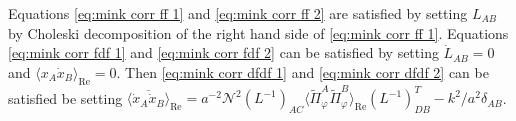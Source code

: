 Equations \eqref{eq:mink corr ff 1} and \eqref{eq:mink corr ff 2} are satisfied by setting $L_{AB}$ by Choleski decomposition of the right hand side of \eqref{eq:mink corr ff 1}. Equations \eqref{eq:mink corr fdf 1} and \eqref{eq:mink corr fdf 2} can be satisfied by setting $\dot{L}_{AB} = 0$ and $\langle x_A\dot{x}_B\rangle_\mathrm{Re} = 0$. Then \eqref{eq:mink corr dfdf 1} and \eqref{eq:mink corr dfdf 2} can be satisfied be setting $\overline{\langle \dot{x}_A\dot{x}_B\rangle}_\mathrm{Re} = a^{-2}\mathcal{N}^2(L^{-1})_{AC}\langle\tilde{\Pi}_\varphi^A\tilde{\Pi}_\varphi^B\rangle_\mathrm{Re}(L^{-1})^T_{DB} - k^2/a^2\delta_{AB}$.


